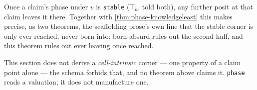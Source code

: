 \begin{theorem}\label{thm:phase-stable-absorbs}\leanok{}
Once a claim's phase under \(v\) is \texttt{stable} (\(\top_k\), told both),
any further posit at that claim leaves it there. Together with
\cref{thm:phase-knowledgeleast} this makes precise, as two theorems, the
scaffolding prose's own line that the stable corner is only ever reached,
never born into: born-absurd rules out the second half, and this theorem
rules out ever leaving once reached.
\end{theorem}

This section does not derive a \emph{cell-intrinsic} corner --- one property
of a claim point alone --- the schema forbids that, and no theorem above
claims it. \texttt{phase} reads a valuation; it does not manufacture one.

